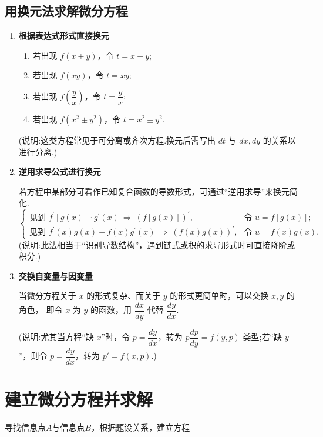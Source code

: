 \subsection{用换元法求解微分方程}

\DTwoThree
\begin{enumerate}
    \item \textbf{根据表达式形式直接换元}
          \begin{enumerate}
              \item 若出现 $f(x\pm y)$，令 $t = x \pm y$;
              \item 若出现 $f(xy)$，令 $t = xy$;
              \item 若出现 $f\!\left(\dfrac{y}{x}\right)$，令 $t = \dfrac{y}{x}$;
              \item 若出现 $f(x^{2}\pm y^{2})$，令 $t = x^{2} \pm y^{2}$.
          \end{enumerate}
          (说明:这类方程常见于可分离或齐次方程.换元后需写出 $dt$ 与 $dx,dy$ 的关系以进行分离.)

    \item \textbf{逆用求导公式进行换元}

          若方程中某部分可看作已知复合函数的导数形式，可通过“逆用求导”来换元简化.
          \[
              \begin{cases}
                  \text{见到 } f^{\prime}[g(x)] \cdot g^{\prime}(x) \ \Rightarrow \ \left(f[g(x)]\right)^{\prime},      & \text{令 } u = f[g(x)];   \\
                  \text{见到 } f^{\prime}(x) g(x) + f(x) g^{\prime}(x) \ \Rightarrow \ \left(f(x) g(x)\right)^{\prime}, & \text{令 } u = f(x) g(x).
              \end{cases}
          \]
          (说明:此法相当于“识别导数结构”，遇到链式或积的求导形式时可直接降阶或积分.)

    \item \textbf{交换自变量与因变量}

          当微分方程关于 $x$ 的形式复杂、而关于 $y$ 的形式更简单时，可以交换 $x,y$ 的角色，
          即令 $x$ 为 $y$ 的函数，用 $\dfrac{dx}{dy}$ 代替 $\dfrac{dy}{dx}$.

          (说明:尤其当方程“缺 $x$”时，令 $p = \dfrac{dy}{dx}$，转为 $p\dfrac{dp}{dy} = f(y,p)$ 类型;若“缺 $y$”，则令 $p = \dfrac{dy}{dx}$，转为 $p' = f(x,p)$.)
\end{enumerate}

\section{建立微分方程并求解}
寻找信息点$A$与信息点$B$，根据题设关系，建立方程

